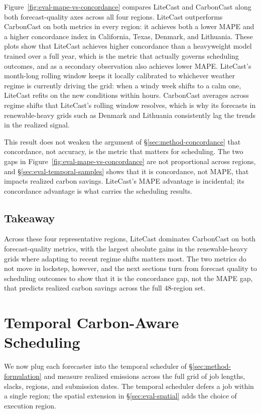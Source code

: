 Figure~\ref{fig:eval-mape-vs-concordance} compares LiteCast and CarbonCast along both forecast-quality axes across all four regions.
LiteCast outperforms CarbonCast on both metrics in every region: it achieves both a lower MAPE and a higher concordance index in California, Texas, Denmark, and Lithuania.
These plots show that LiteCast achieves higher concordance than a heavyweight model trained over a full year, which is the metric that actually governs scheduling outcomes, and as a secondary observation also achieves lower MAPE.
LiteCast's month-long rolling window keeps it locally calibrated to whichever weather regime is currently driving the grid: when a windy week shifts to a calm one, LiteCast refits on the new conditions within hours.
CarbonCast averages across regime shifts that LiteCast's rolling window resolves, which is why its forecasts in renewable-heavy grids such as Denmark and Lithuania consistently lag the trends in the realized signal.

This result does not weaken the argument of \S\ref{sec:method-concordance} that concordance, not accuracy, is the metric that matters for scheduling.
The two gaps in Figure~\ref{fig:eval-mape-vs-concordance} are not proportional across regions, and \S\ref{sec:eval-temporal-samples} shows that it is concordance, not MAPE, that impacts realized carbon savings.
LiteCast's MAPE advantage is incidental; its concordance advantage is what carries the scheduling results.

\subsection{Takeaway}
\label{sec:eval-forecast-takeaway}

Across these four representative regions, LiteCast dominates CarbonCast on both forecast-quality metrics, with the largest absolute gains in the renewable-heavy grids where adapting to recent regime shifts matters most.
The two metrics do not move in lockstep, however, and the next sections turn from forecast quality to scheduling outcomes to show that it is the concordance gap, not the MAPE gap, that predicts realized carbon savings across the full $48$-region set.

\section{Temporal Carbon-Aware Scheduling}
\label{sec:eval-temporal}

We now plug each forecaster into the temporal scheduler of \S\ref{sec:method-formulation} and measure realized emissions across the full grid of job lengths, slacks, regions, and submission dates.
The temporal scheduler defers a job within a single region; the spatial extension in \S\ref{sec:eval-spatial} adds the choice of execution region.

